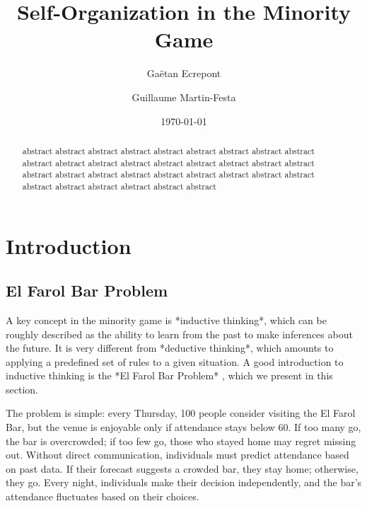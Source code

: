 \documentclass[a4paper, amsfonts, amssymb, amsmath, reprint, showkeys, nofootinbib, twoside]{revtex4-1}
\begin{document}
\title{Self-Organization in the Minority Game}

\author{Gaëtan Ecrepont}
\author{Guillaume Martin-Festa}

\date{\today} %

\begin{abstract}
    abstract abstract abstract abstract abstract abstract abstract abstract abstract abstract abstract abstract abstract abstract abstract abstract abstract abstract abstract abstract abstract abstract abstract abstract abstract abstract abstract abstract abstract abstract abstract abstract abstract 
\end{abstract}


\maketitle


\section{Introduction}
\label{sec:introduction}

\subsection{El Farol Bar Problem}
A key concept in the minority game is *inductive thinking*, which can be roughly described as the ability to learn from the past to make inferences about the future. It is very different from *deductive thinking*, which amounts to applying a predefined set of rules to a given situation. A good introduction to inductive thinking is the *El Farol Bar Problem* \cite{Arthur_1994}, which we present in this section.

The problem is simple: every Thursday, 100 people consider visiting the El Farol Bar, but the venue is enjoyable only if attendance stays below 60. If too many go, the bar is overcrowded; if too few go, those who stayed home may regret missing out. Without direct communication, individuals must predict attendance based on past data. If their forecast suggests a crowded bar, they stay home; otherwise, they go. Every night, individuals make their decision independently, and the bar's attendance fluctuates based on their choices.
\end{document}
